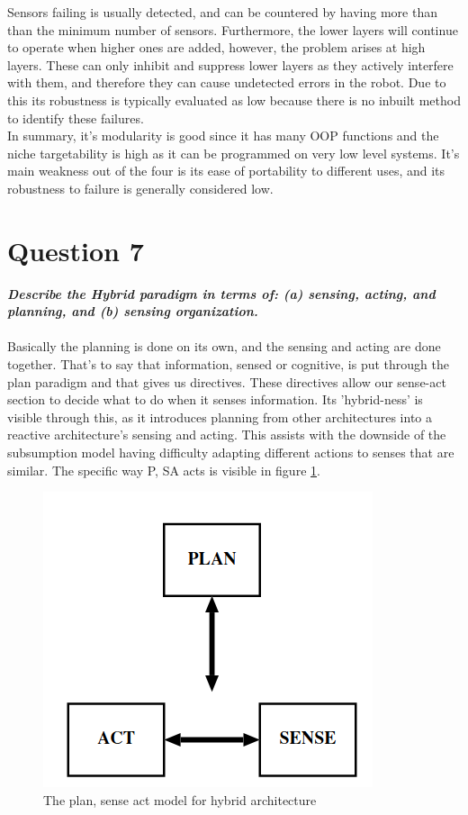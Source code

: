 \documentclass{article}
\newcommand\tab[1][1cm]{\hspace*{#1}}
\begin{document}
Sensors failing is usually detected, and can be countered by having 
more than than the minimum number of sensors. 
Furthermore, the lower layers will continue to operate when higher ones
are added, however, the problem arises at high layers. 
These can only inhibit and suppress lower layers as they actively
interfere with them, and therefore they can cause undetected 
errors in the robot. Due to this its robustness is typically
evaluated as low because there is no inbuilt method to identify 
these failures. \cite{IntroToAI} \cite{reactiveParadigms}
\\
\tab In summary, it's modularity is good since it has many OOP functions and the niche targetability is high as it can be programmed
on very low level systems. 
It's main weakness out of the four is its ease of portability to different uses, and its robustness to failure
is generally considered low.

\section*{Question 7}
\textbf{\textit{
    \tab Describe the Hybrid paradigm in terms of: (a) sensing, acting, and planning, and (b) sensing organization.
}} \\ \\

Basically the planning is done on its own, and the sensing and acting are done together. That's to say that information,
sensed or cognitive, is put through the plan paradigm and that gives us directives. These directives allow our sense-act
section to decide what to do when it senses information. Its 'hybrid-ness' is visible through this, as it introduces
planning from other architectures into a reactive architecture's sensing and acting.
This assists with the downside of the subsumption model having difficulty adapting different actions 
to senses that are similar. The specific way P, SA acts is visible in figure \ref{HybridPSA}.

\begin{figure}[ht]
    \centering
    \includegraphics[scale=0.5]{img/PSA-Hybrid.png}
    \caption{The plan, sense act model for hybrid architecture}
    \label{HybridPSA}
\end{figure}
\end{document}
